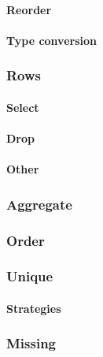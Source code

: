 \documentclass[]{article}
\let\oldparagraph\paragraph
\renewcommand{\paragraph}[1]{\oldparagraph{#1}\mbox{}}
\begin{document}
\paragraph{Reorder}\label{reorder}

\paragraph{Type conversion}\label{type-conversion}

\subsubsection{Rows}\label{rows}

\paragraph{Select}\label{select-1}

\paragraph{Drop}\label{drop-1}

\paragraph{Other}\label{other}

\subsubsection{Aggregate}\label{aggregate}

\subsubsection{Order}\label{order}

\subsubsection{Unique}\label{unique}

\paragraph{Strategies}\label{strategies}

\subsubsection{Missing}\label{missing}
\end{document}
